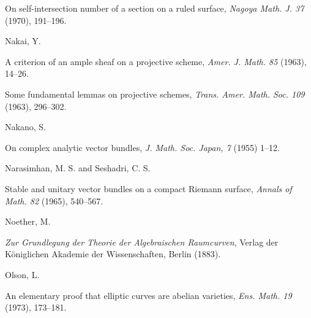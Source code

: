 {\noindent\hangindent=25bp\hspace*{6bp}%
On self-intersection number of a section on a ruled surface, \emph{Nagoya Math. J. 37} (1970), 191--196.\par
\par\vspace{2.15pt}\noindent \hypertarget{bib-480-16}{}Nakai, Y.\par
\noindent\hangindent=25bp\hspace*{6bp}%
A criterion of an ample sheaf on a projective scheme, \emph{Amer. J. Math. 85} (1963), 14--26.\par
\noindent\hangindent=25bp\hspace*{6bp}%
Some fundamental lemmas on projective schemes, \emph{Trans. Amer. Math. Soc. 109} (1963), 296--302.\par
\par\vspace{2.15pt}\noindent \hypertarget{bib-480-18}{}Nakano, S.\par
\noindent\hangindent=25bp\hspace*{6bp}%
On complex analytic vector bundles, \emph{J. Math. Soc. Japan, 7} (1955) 1--12.\par
\par\vspace{2.15pt}\noindent \hypertarget{bib-480-19}{}Narasimhan, M. S. and Seshadri, C. S.\par
\noindent\hangindent=25bp\hspace*{6bp}%
Stable and unitary vector bundles on a compact Riemann surface, \emph{Annals of Math. 82} (1965), 540--567.\par
\par\vspace{2.15pt}\noindent \hypertarget{bib-480-20}{}Noether, M.\par
\noindent\hangindent=25bp\hspace*{6bp}%
\emph{Zur Grundlegung der Theorie der Algebraischen Raumcurven}, Verlag der K\"oniglichen Akademie der Wissenschaften, Berlin (1883).\par
\par\vspace{2.15pt}\noindent \hypertarget{bib-480-21}{}Olson, L.\par
\noindent\hangindent=25bp\hspace*{6bp}%
An elementary proof that elliptic curves are abelian varieties, \emph{Ens. Math. 19} (1973), 173--181.\par
}
